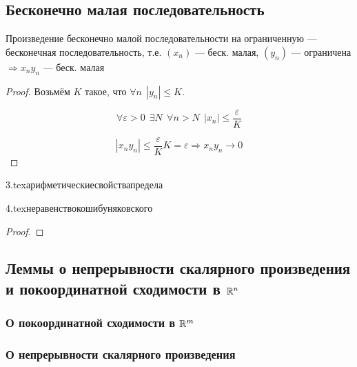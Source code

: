 \subsection{Бесконечно малая последовательность}
Произведение бесконечно малой последовательности на ограниченную --- бесконечная последовательность, т.е. $(x_n)$ --- беск. малая, $(y_n)$ --- ограничена $\Rightarrow x_ny_n$ --- беск. малая
\begin{proof}
    Возьмём $K$ такое, что $\forall n \ \ |y_n|\leq K$.

    $$\forall \varepsilon > 0 \ \ \exists N \ \ \forall n > N \ \ |x_n|\leq\frac{\varepsilon}{K}$$

    $$|x_ny_n|\leq\frac{\varepsilon}{K}K=\varepsilon \Rightarrow x_ny_n\to0$$
\end{proof}

{3.tex}{арифметическиесвойствапредела}

{4.tex}{неравенствокошибуняковского}
\begin{proof}
\end{proof}

\subsection{Леммы о непрерывности скалярного произведения и покоординатной сходимости в $\mathbb{R}^n$}
\subsubsection{О покоординатной сходимости в $\mathbb{R}^m$}

\subsubsection{О непрерывности скалярного произведения}

